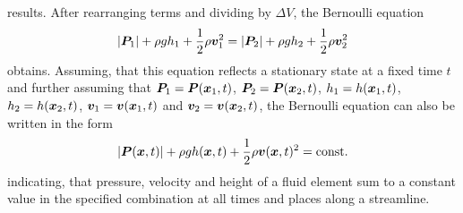 \documentclass[a4paper,11pt]{report}
\begin{document}
\begin{equation}
\end{equation} results. After rearranging terms and dividing by $\Delta V$, the Bernoulli equation \begin{equation}
|\bm{P}_1| + \rho g h_1 + \frac{1}{2}\rho \bm{v}_1^2 = |\bm{P}_2| + \rho g h_2 + \frac{1}{2}\rho \bm{v}_2^2
\end{equation} obtains. Assuming, that this equation reflects a stationary state at a fixed time $t$ and further assuming that $\bm{P}_1 = \bm{P}(\bm{x}_1,t)$, $\bm{P}_2 = \bm{P}(\bm{x}_2,t)$, $h_1 = h(\bm{x}_1,t)$, $h_2 = h(\bm{x}_2,t)$, $\bm{v}_1 = \bm{v}(\bm{x}_1,t)$ and $\bm{v}_2 = \bm{v}(\bm{x}_2,t)$, the Bernoulli equation can also be written in the form \begin{equation}
|\bm{P}(\bm{x},t)| + \rho g h(\bm{x},t)+ \frac{1}{2}\rho \bm{v}(\bm{x},t)^2 = \text{const.}
\end{equation} indicating, that pressure, velocity and height of a fluid element sum to a constant value in the specified combination at all times and places along a streamline.
\end{document}
